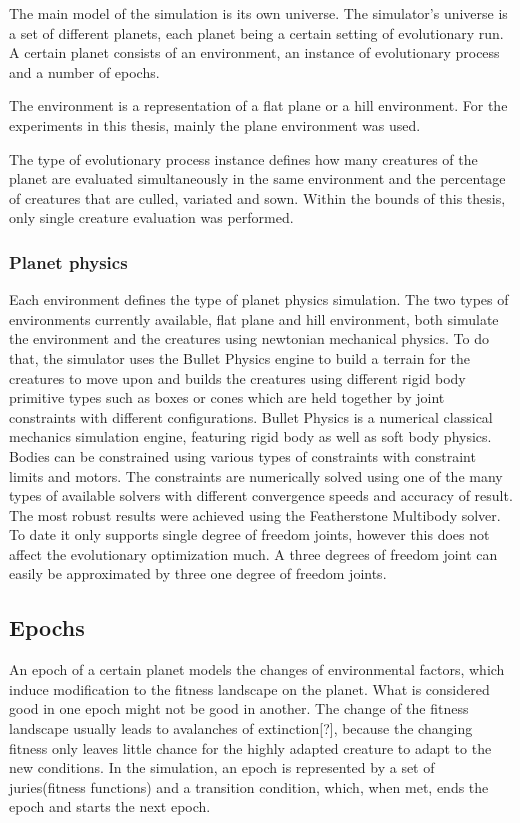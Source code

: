 \documentclass[main]{subfiles}
\begin{document}
The main model of the simulation is its own universe. The simulator's universe is a set of different planets, each planet being a certain setting of evolutionary run. A certain planet consists of an environment, an instance of evolutionary process and a number of epochs. 

The environment is a representation of a flat plane or a hill environment. For the experiments in this thesis, mainly the plane environment was used.

The type of evolutionary process instance defines how many creatures of the planet are evaluated simultaneously in the same environment and the percentage of creatures that are culled, variated and sown. Within the bounds of this thesis, only single creature evaluation was performed. 

\subsubsection{Planet physics}

Each environment defines the type of planet physics simulation. The two types of environments currently available, flat plane and hill environment, both simulate the environment and the creatures using newtonian mechanical physics. To do that, the simulator uses the Bullet Physics engine\cite{bib:BulletPhysics2015} to build a terrain for the creatures to move upon and builds the creatures using different rigid body primitive types such as boxes or cones which are held together by joint constraints with different configurations. Bullet Physics is a numerical classical mechanics simulation engine, featuring rigid body as well as soft body physics. Bodies can be constrained using various types of constraints with constraint limits and motors. The constraints are numerically solved using one of the many types of available solvers with different convergence speeds and accuracy of result. The most robust results were achieved using the Featherstone Multibody solver. To date it only supports single degree of freedom joints, however this does not affect the evolutionary optimization much. A three degrees of freedom joint can easily be approximated by three one degree of freedom joints.

\subsection{Epochs}

An epoch of a certain planet models the changes of environmental factors, which induce modification to the fitness landscape on the planet. What is considered good in one epoch might not be good in another. The change of the fitness landscape usually leads to avalanches of extinction[?], because the changing fitness only leaves little chance for the highly adapted creature to adapt to the new conditions. In the simulation, an epoch  is represented by a set of juries(fitness functions) and a transition condition, which, when met, ends the epoch and starts the next epoch.
\end{document}
